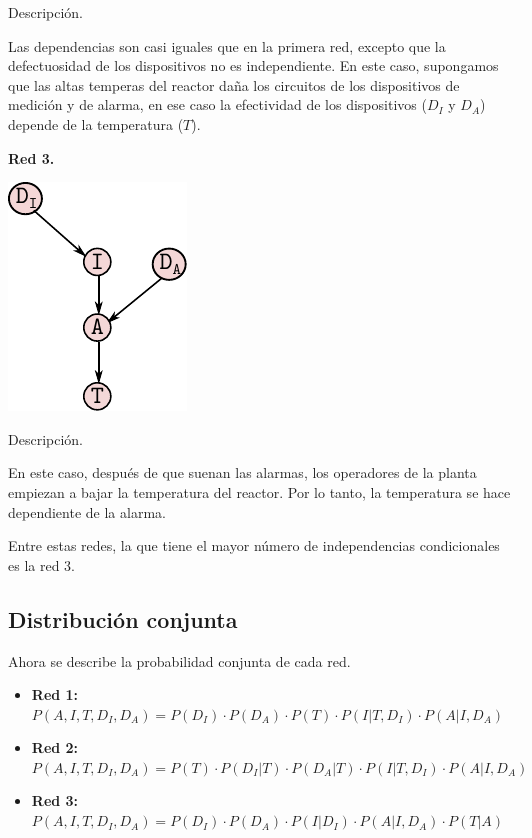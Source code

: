 \documentclass{article}
\begin{document}
Descripción.

Las dependencias son casi iguales que en la primera red, excepto que la defectuosidad de los dispositivos no es independiente. En este caso, supongamos que las altas temperas del reactor daña los circuitos de los dispositivos de medición y de alarma, en ese caso la efectividad de los dispositivos ($D_I$ y $D_A$) depende de la temperatura ($T$).

\textbf{Red 3.}

\begin{center}
\includegraphics[scale=1]{ej1_red3}
\end{center}

Descripción.

En este caso, después de que suenan las alarmas, los operadores de la planta empiezan a bajar la temperatura del reactor. Por lo tanto, la temperatura se hace dependiente de la alarma.

Entre estas redes, la que tiene el mayor número de independencias condicionales es la red 3.

\subsection{Distribución conjunta}

Ahora se describe la probabilidad conjunta de cada red.

\begin{itemize}
\item \textbf{Red 1:} $P(A, I, T, D_I, D_A) = P(D_I) \cdot P(D_A) \cdot P(T) \cdot P(I | T, D_I) \cdot P(A | I, D_A)$

\item \textbf{Red 2:} $P(A, I, T, D_I, D_A) = P(T) \cdot P(D_I | T) \cdot P(D_A | T) \cdot P(I | T, D_I) \cdot P(A | I, D_A)$

\item \textbf{Red 3:} $P(A, I, T, D_I, D_A) = P(D_I) \cdot P(D_A) \cdot P(I | D_I) \cdot P(A | I, D_A) \cdot P(T | A)$

\end{itemize}
\end{document}
